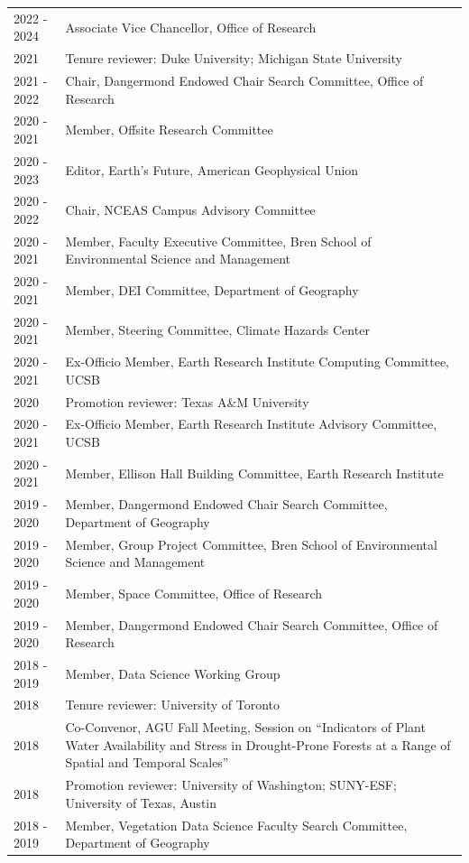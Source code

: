 \begin{longtable}{l p{5.5in}}
2022 - 2024 & Associate Vice Chancellor, Office of Research \\
2021 & Tenure reviewer: Duke University; Michigan State University \\
2021 - 2022 & Chair, Dangermond Endowed Chair Search Committee, Office of Research \\
2020 - 2021 & Member, Offsite Research Committee \\
2020 - 2023 & Editor, Earth's Future, American Geophysical Union \\
2020 - 2022 & Chair, NCEAS Campus Advisory Committee \\
2020 - 2021 & Member, Faculty Executive Committee, Bren School of Environmental Science and Management \\
2020 - 2021 & Member, DEI Committee, Department of Geography \\
2020 - 2021 & Member, Steering Committee, Climate Hazards Center \\
2020 - 2021 & Ex-Officio Member, Earth Research Institute Computing Committee, UCSB \\
2020 & Promotion reviewer: Texas A\&M University \\
2020 - 2021 & Ex-Officio Member, Earth Research Institute Advisory Committee, UCSB \\
2020 - 2021 & Member, Ellison Hall Building Committee, Earth Research Institute \\
2019 - 2020 & Member, Dangermond Endowed Chair Search Committee, Department of Geography \\
2019 - 2020 & Member, Group Project Committee, Bren School of Environmental Science and Management \\
2019 - 2020 & Member, Space Committee, Office of Research \\
2019 - 2020 & Member, Dangermond Endowed Chair Search Committee, Office of Research \\
2018 - 2019 & Member, Data Science Working Group \\
2018 & Tenure reviewer: University of Toronto \\
2018 & Co-Convenor, AGU Fall Meeting, Session on ``Indicators of Plant Water Availability and Stress in Drought-Prone Forests at a Range of Spatial and Temporal Scales'' \\
2018 & Promotion reviewer: University of Washington; SUNY-ESF; University of Texas, Austin \\
2018 - 2019 & Member, Vegetation Data Science Faculty Search Committee, Department of Geography \\

\end{longtable}
